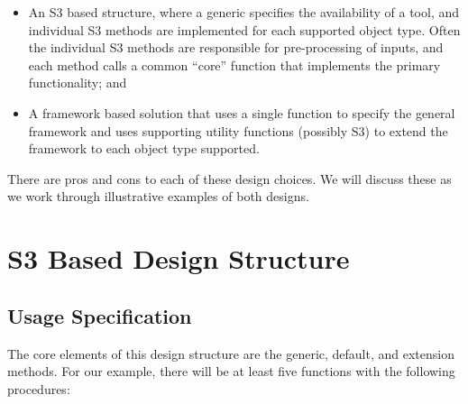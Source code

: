 \documentclass[
]{book}
\providecommand{\tightlist}{%
  \setlength{\itemsep}{0pt}\setlength{\parskip}{0pt}}
\begin{document}
\begin{itemize}
\tightlist
\item
  An S3 based structure, where a generic specifies the availability of a tool, and individual S3 methods are implemented for each supported object type. Often the individual S3 methods are responsible for pre-processing of inputs, and each method calls a common ``core'' function that implements the primary functionality; and
\item
  A framework based solution that uses a single function to specify the general framework and uses supporting utility functions (possibly S3) to extend the framework to each object type supported.
\end{itemize}

There are pros and cons to each of these design choices. We will discuss these as we work through illustrative examples of both designs.

\hypertarget{s3-based-design-structure}{%
\section{S3 Based Design Structure}\label{s3-based-design-structure}}

\hypertarget{usage-specification}{%
\subsection{Usage Specification}\label{usage-specification}}

The core elements of this design structure are the generic, default, and extension methods. For our example, there will be at least five functions with the following procedures:
\end{document}
